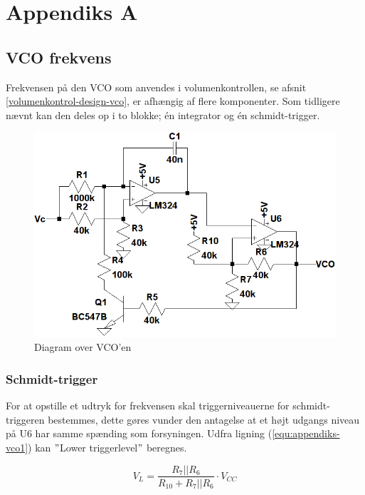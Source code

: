 \chapter{Appendiks A}
\label{vco-frekvens}
\section*{VCO frekvens}

Frekvensen på den VCO som anvendes i volumenkontrollen, se afsnit \ref{volumenkontrol-design-vco}, er afhængig af flere komponenter. Som tidligere nævnt kan den deles op i to blokke; én integrator og én schmidt-trigger. 

\begin{figure}[h]
\centering
\includegraphics[width=\textwidth]{teknisk/volumenkontrol/vco.png}
\caption{Diagram over VCO'en}
\label{fig:appendiks-vco}
\end{figure}

\subsection*{Schmidt-trigger}

For at opstille et udtryk for frekvensen skal triggerniveauerne for schmidt-triggeren bestemmes, dette gøres vunder den antagelse at et højt udgangs niveau på U6 har samme spænding som forsyningen. Udfra ligning (\ref{equ:appendiks-vco1}) kan $"$Lower triggerlevel$"$ beregnes.

\begin{equation}
\label{equ:appendiks-vco1}
V_L = \frac{R_7||R_6}{R_{10} + R_7||R_6} \cdot V_{CC}
\end{equation}

